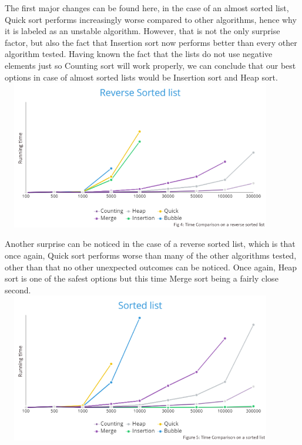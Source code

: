 \documentclass{article}
\begin{document}
\begin{center}
The first major changes can be found here, in the case of an almost sorted list, Quick sort performs increasingly worse compared to other algorithms, hence why it is labeled as an unstable algorithm. However, that is not the only surprise factor, but also the fact that Insertion sort now performs better than every other algorithm tested. Having known the fact that the lists do not use negative elements just so Counting sort will work properly, we can conclude that our best options in case of almost sorted lists would be Insertion sort and Heap sort.
\smallbreak
\includegraphics[width=12.2cm, height=6.5cm]{Pics/Reverse Sorted list_.png}


Another surprise can be noticed in the case of a reverse sorted list, which is that once again, Quick sort performs worse than many of the other algorithms tested, other than that no other unexpected outcomes can be noticed. Once again, Heap sort is one of the safest options but this time Merge sort being a fairly close second.
\includegraphics[width=12.2cm, height=6.5cm]{Pics/Sorted list.png}


\end{center}
\end{document}
